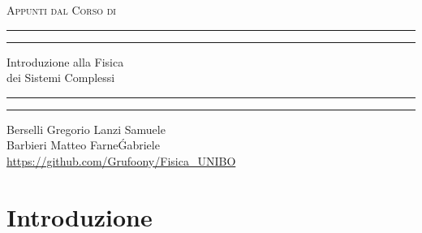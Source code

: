 \documentclass[12pt, a4paper]{book}
\theoremstyle{theorem}
\begin{document}
	\begin{titlepage}
		\centering %
		\scshape %
		Appunti dal Corso di
		\vspace*{1.5\baselineskip} %
		
		
		
		\rule{13cm}{1.6pt}\vspace*{-\baselineskip}\vspace*{2pt} %
		\rule{13cm}{0.4pt} %
		
		\vspace{0.75\baselineskip} %
		{ \Huge Introduzione alla Fisica\\
		\vspace{4mm}
		dei Sistemi Complessi \\ }
		\vspace{0.75\baselineskip} %
		\rule{13cm}{0.4pt}\vspace*{-\baselineskip}\vspace{3.2pt} %
		\rule{13cm}{1.6pt} %
		
		\vspace{1.75\baselineskip} %
		{}
		Berselli Gregorio \quad Lanzi Samuele\\
		Barbieri Matteo \quad Farne\' Gabriele\\
		\url{https://github.com/Grufoony/Fisica_UNIBO}
		\vfill
	\end{titlepage}
	\tableofcontents
	\chapter{Introduzione} %
\end{document}
